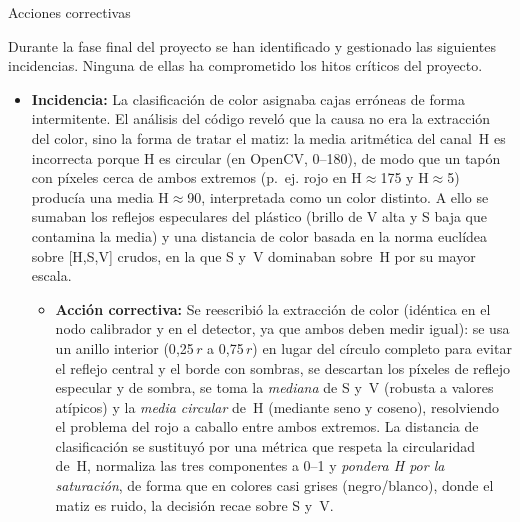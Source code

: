 \documentclass[12pt,a4paper]{article}
\makeatletter
\newcommand{\subsecfmt}[1]{%
  {\large\bfseries\color{MediumBlue}#1}%
  \par\vspace{2pt}%
}
\renewcommand\subsection{%
  \@ifstar\subsection@star\subsection@nostar
}
\newcommand\subsection@nostar[1]{%
  \refstepcounter{subsection}%
  \addcontentsline{toc}{subsection}{\protect\numberline{\thesubsection}#1}%
  \vspace{10pt}%
  \subsecfmt{\thesubsection.\enspace #1}%
  \vspace{2pt}%
}
\newcommand\subsection@star[1]{%
  \vspace{10pt}\subsecfmt{#1}\vspace{2pt}%
}
\newcommand{\mywphead}[1]{%
  \vspace{8pt}%
  \noindent{\normalsize\bfseries\color{MediumBlue}#1}%
  \par\vspace{3pt}}
\makeatother
\begin{document}
\subsection{Acciones correctivas}

Durante la fase final del proyecto se han identificado y gestionado las siguientes incidencias.
Ninguna de ellas ha comprometido los hitos críticos del proyecto.

\mywphead{WP-300 -- Sistema de Visión}
\begin{itemize}
  \item \textbf{Incidencia:} La clasificación de color asignaba cajas erróneas de forma intermitente.
        El análisis del código reveló que la causa no era la extracción del color, sino la forma de tratar el matiz: la media aritmética del canal~H es
        incorrecta porque H es circular (en OpenCV, 0--180), de modo que un tapón con píxeles cerca de
        ambos extremos (p.~ej. rojo en H$\approx$175 y H$\approx$5) producía una media H$\approx$90,
        interpretada como un color distinto. A ello se sumaban los reflejos especulares del plástico
        (brillo de V alta y S baja que contamina la media) y una distancia de color basada en la norma
        euclídea sobre [H,S,V] crudos, en la que S y~V dominaban sobre~H por su mayor escala.
  \vspace{9.2pt}
  \begin{itemize}
    \item \textbf{Acción correctiva:} Se reescribió la extracción de color (idéntica en el nodo
          calibrador y en el detector, ya que ambos deben medir igual): se usa un anillo interior
          (0{,}25\,$r$ a 0{,}75\,$r$) en lugar del círculo completo para evitar el reflejo central y el
          borde con sombras, se descartan los píxeles de reflejo especular y de sombra, se toma la
          \textit{mediana} de S y~V (robusta a valores atípicos) y la \textit{media circular} de~H
          (mediante seno y coseno), resolviendo el problema del rojo a caballo entre ambos extremos.
          La distancia de clasificación se sustituyó por una métrica que respeta la circularidad de~H,
          normaliza las tres componentes a 0--1 y \textit{pondera H por la saturación}, de forma que en
          colores casi grises (negro/blanco), donde el matiz es ruido, la decisión recae sobre S y~V.
  \end{itemize}
\end{itemize}
\end{document}
